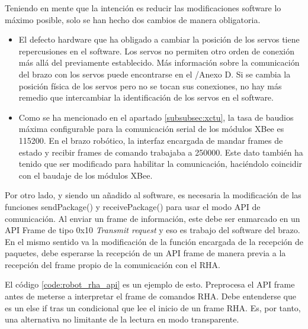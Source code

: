 Teniendo en mente que la intención es reducir las modificaciones software lo máximo posible, solo se han hecho dos cambios de manera obligatoria.
\begin{itemize}
\item El defecto hardware que ha obligado a cambiar la posición de los servos tiene repercusiones en el software. Los servos no permiten otro orden de conexión más allá del previamente establecido. Más información sobre la comunicación del brazo con los servos puede encontrarse en el \cite{Heredia1:2018}/Anexo D. Si se cambia la posición física de los servos pero no se tocan sus conexiones, no hay más remedio que intercambiar la identificación de los servos en el software.

\item Como se ha mencionado en el apartado \ref{subsubsec:xctu}, la tasa de baudios máxima configurable para la comunicación serial de los módulos XBee es 115200. En el brazo robótico, la interfaz encargada de mandar frames de estado y recibir frames de comando trabajaba a 250000. Este dato también ha tenido que ser modificado para habilitar la comunicación, haciéndolo coincidir con el baudaje de los módulos XBee.
\end{itemize}

Por otro lado, y siendo un añadido al software, es necesaria la modificación de las funciones sendPackage() y receivePackage() para usar el modo API de comunicación. Al enviar un frame de información, este debe ser enmarcado en un API Frame de tipo 0x10 \textit{Transmit request} y eso es trabajo del software del brazo. En el mismo sentido va la modificación de la función encargada de la recepción de paquetes, debe esperarse la recepción de un API frame de manera previa a la recepción del frame propio de la comunicación con el RHA.

El código \ref{code:robot_rha_api} es un ejemplo de esto. Preprocesa el API frame antes de meterse a interpretar el frame de comandos RHA. Debe entenderse que es un else if tras un condicional que lee el inicio de un frame RHA. Es, por tanto, una alternativa no limitante de la lectura en modo transparente.


